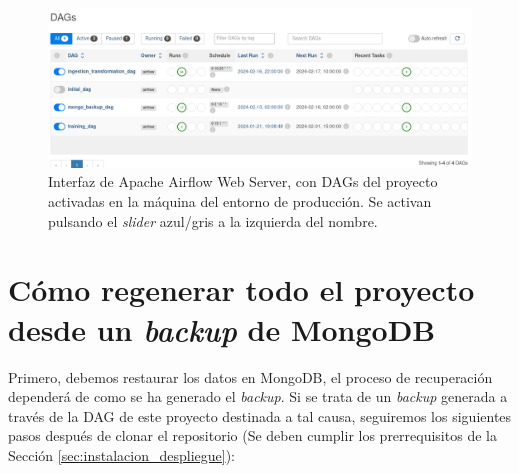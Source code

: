 \begin{figure}[ht]
    \centering
	\includegraphics[width=1\textwidth]{img/airflow_interfaz.PNG}
	\caption[Interfaz de Apache Airflow Web Server, con DAGs del proyecto]{Interfaz de Apache Airflow Web Server, con DAGs del proyecto activadas en la máquina del entorno de producción. Se activan pulsando el \textit{slider} azul/gris a la izquierda del nombre.}
	\label{fig:airflow_interfaz}
\end{figure}

\clearpage
\section{Cómo regenerar todo el proyecto desde un \textit{backup} de MongoDB}\label{sec:regenerar_desde_backup}

Primero, debemos restaurar los datos en MongoDB, el proceso de recuperación dependerá de como se ha generado el \textit{backup}. Si se trata de un \textit{backup} generada a través de la DAG de este proyecto destinada a tal causa, seguiremos los siguientes pasos después de clonar el repositorio (Se deben cumplir los prerrequisitos de la Sección \ref{sec:instalacion_despliegue}):

